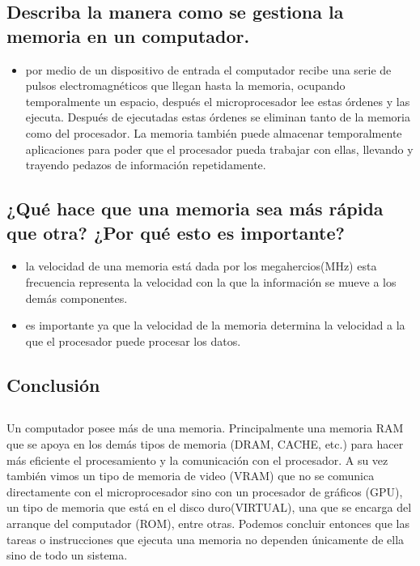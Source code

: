 \documentclass{article}
\begin{document}
\subsection{Describa la manera como se gestiona la memoria en un computador.}
    \begin{itemize} \item{}
    por medio de un dispositivo de entrada el computador recibe una serie de pulsos electromagnéticos que llegan hasta la memoria, ocupando temporalmente un espacio, después el microprocesador lee estas órdenes y las ejecuta. Después de ejecutadas estas órdenes se eliminan tanto de la memoria como del procesador. La memoria también puede almacenar temporalmente aplicaciones para poder que el procesador pueda trabajar con ellas, llevando y trayendo pedazos de información repetidamente.\cite{Referencia}
    \end{itemize}

\subsection{¿Qué hace que una memoria sea más rápida que otra? ¿Por qué esto es importante?}
    \begin{itemize} 
    \item{}la velocidad de una memoria está dada por los megahercios(MHz) esta frecuencia representa la velocidad con la que la información se mueve a los demás componentes.\cite{graficas}
    \item{}es importante ya que la velocidad de la memoria determina la velocidad a la que el procesador puede procesar los datos. \cite{graficas}
    \end{itemize}
\pagebreak



\begin{center}
    

\section{Conclusión} \label{conclulsion} \end{center}
\subsection{}
Un computador posee más de una memoria. Principalmente una memoria RAM que se apoya en los demás tipos de memoria (DRAM, CACHE, etc.) para hacer más eficiente el procesamiento y la comunicación con el procesador. A su vez también vimos un tipo de memoria de video (VRAM) que no se comunica directamente con el microprocesador sino con un procesador de gráficos (GPU), un tipo de memoria que está en el disco duro(VIRTUAL), una que se encarga del arranque del computador (ROM), entre otras.
\newline
Podemos concluir entonces que las tareas o instrucciones que ejecuta una memoria no dependen únicamente de ella sino de todo un sistema.


\pagebreak



\label{graficas}
\end{document}
